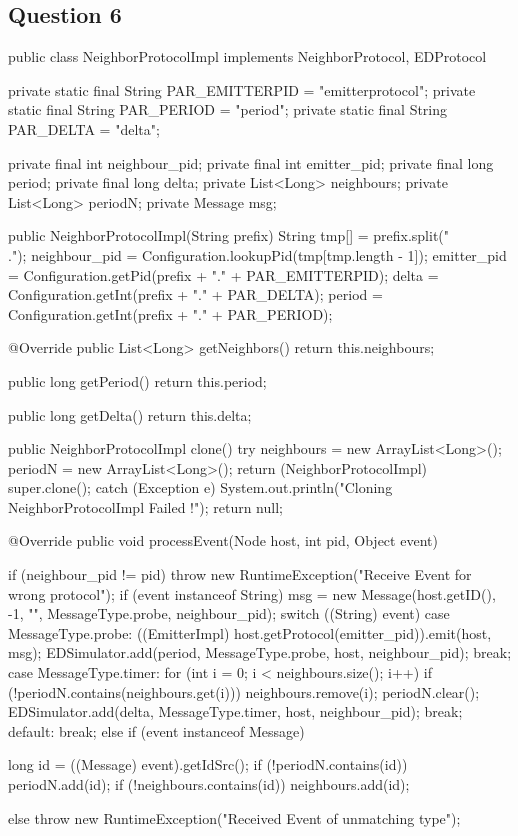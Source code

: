 \documentclass[10pt]{report}
\begin{document}
\subsection{Question 6}

\begin{boxedlisting}
public class NeighborProtocolImpl implements NeighborProtocol, EDProtocol {

	private static final String PAR_EMITTERPID = "emitterprotocol";
	private static final String PAR_PERIOD = "period";
	private static final String PAR_DELTA = "delta";

	private final int neighbour_pid;
	private final int emitter_pid;
	private final long period;
	private final long delta;
	private List<Long> neighbours;
	private List<Long> periodN;
	private Message msg;
	
	public NeighborProtocolImpl(String prefix) {
		String tmp[] = prefix.split("\\.");
		neighbour_pid = Configuration.lookupPid(tmp[tmp.length - 1]);
		emitter_pid = Configuration.getPid(prefix + "." + PAR_EMITTERPID);
		delta = Configuration.getInt(prefix + "." + PAR_DELTA);
		period = Configuration.getInt(prefix + "." + PAR_PERIOD);
	}

	@Override
	public List<Long> getNeighbors() {
		return this.neighbours;
	}

	public long getPeriod() {
		return this.period;
	}

	public long getDelta() {
		return this.delta;
	}

	public NeighborProtocolImpl clone() {
		try {
			neighbours = new ArrayList<Long>();
			periodN = new ArrayList<Long>();
			return (NeighborProtocolImpl) super.clone();
		} catch (Exception e) {
			System.out.println("Cloning NeighborProtocolImpl Failed !");
		}
		return null;
	}

	@Override
	public void processEvent(Node host, int pid, Object event) {
		if (neighbour_pid != pid) {
			throw new RuntimeException("Receive Event for wrong protocol");
		}
		if (event instanceof String) {
			msg = new Message(host.getID(), -1, "", MessageType.probe, neighbour_pid);
			switch ((String) event) {
			case MessageType.probe:
				((EmitterImpl) host.getProtocol(emitter_pid)).emit(host, msg);
				EDSimulator.add(period, MessageType.probe, host, neighbour_pid);
				break;
			case MessageType.timer:
				for (int i = 0; i < neighbours.size(); i++) {
					if (!periodN.contains(neighbours.get(i))) {
						neighbours.remove(i);
					}
				}
				periodN.clear();
				EDSimulator.add(delta, MessageType.timer, host, neighbour_pid);
				break;
			default:
				break;
			}
		} else if (event instanceof Message) {
			long id = ((Message) event).getIdSrc();
			if (!periodN.contains(id)) {
				periodN.add(id);
			}
			if (!neighbours.contains(id)) {
				neighbours.add(id);
			}
			
		} else {
			throw new RuntimeException("Received Event of unmatching type");
		}
	}
}
\end{boxedlisting}
\end{document}
